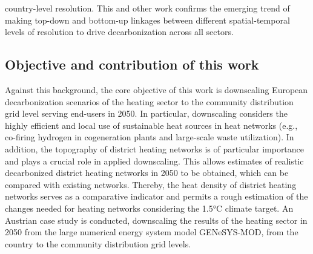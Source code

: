 country-level resolution. This and other work confirms the emerging trend of making top-down and bottom-up linkages between different spatial-temporal levels of resolution to drive decarbonization across all sectors.\vspace{0.3cm}

\subsection{Objective and contribution of this work}
Against this background, the core objective of this work is downscaling European decarbonization scenarios of the heating sector to the community  distribution grid level serving end-users in 2050. In particular, downscaling considers the highly efficient and local use of sustainable heat sources in  heat networks (e.g., co-firing hydrogen in cogeneration plants and large-scale waste utilization). In addition, the topography of district heating networks is of particular importance and plays a crucial role in applied downscaling. This allows estimates of realistic  decarbonized district heating networks in 2050 to be obtained, which can be compared with existing networks. Thereby, the heat density of district heating networks serves as a comparative indicator and permits a rough estimation of the changes needed for  heating networks considering the 1.5°C climate target. An Austrian case study is conducted, downscaling the  results of the heating sector in 2050 from the large numerical energy system model GENeSYS-MOD, from the country to the community distribution grid levels.\vspace{0.3cm}

